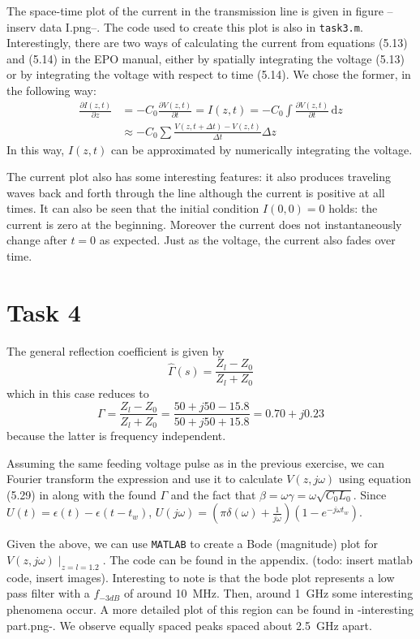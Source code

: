 \documentclass[11pt,titlepage]{report}
\begin{document}
The space-time plot of the current in the transmission line is given in figure --inserv data I.png--. The code used to create this plot is also in \texttt{task3.m}. Interestingly, there are two ways of calculating the current from equations (5.13) and (5.14) in the EPO manual, either by spatially integrating the voltage (5.13) or by integrating the voltage with respect to time (5.14). We chose the former, in the following way:
\begin{align}
\frac{\partial I(z,t)}{\partial z}&=-C_0\frac{\partial V(z,t)}{\partial t} = I(z,t)=-C_0\int \! \frac{\partial V(z,t)}{\partial t}\, \mathrm{d}z \nonumber \\
&\approx -C_0\sum\frac{V(z,t+\Delta t)-V(z,t)}{\Delta t}\Delta z
\end{align}
In this way, $I(z,t)$ can be approximated by numerically integrating the voltage. 

The current plot also has some interesting features: it also produces traveling waves back and forth through the line although the current is positive at all times. It can also be seen that the initial condition $I(0,0)=0$ holds: the current is zero at the beginning. Moreover the current does not instantaneously change after $t=0$ as expected. Just as the voltage, the current also fades over time.

\section{Task 4}
The general reflection coefficient is given by 
\begin{equation}
\hat{\Gamma}(s)=\frac{Z_l-Z_0}{Z_l+Z_0}
\end{equation}
which in this case reduces to
\begin{equation}
\Gamma = \frac{Z_l-Z_0}{Z_l+Z_0}=\frac{50+j50-15.8}{50+j50+15.8}=0.70+j0.23
\end{equation}
because the latter is frequency independent.

Assuming the same feeding voltage pulse as in the previous exercise, we can Fourier transform the expression and use it to calculate $V(z,j\omega)$ using equation (5.29) in \cite[63]{epo4-manual} along with the found $\Gamma$ and the fact that $\beta=\omega\gamma=\omega\sqrt{C_0L_0}$. Since $U(t)=\epsilon(t)-\epsilon(t-t_w)$, $U(j\omega)=(\pi\delta(\omega)+\frac{1}{j\omega})(1-e^{-j\omega t_w})$.

Given the above, we can use \texttt{MATLAB} to create a Bode (magnitude) plot for $V(z,j\omega)\mid_{z=l=1.2}$. The code can be found in the appendix. (todo: insert matlab code, insert images). 
Interesting to note is that the bode plot represents a low pass filter with a $f_{-3dB}$ of around \SI{10}{\mega\hertz}. Then, around \SI{1}{\giga\hertz} some interesting phenomena occur. A more detailed plot of this region can be found in -interesting part.png-. We observe equally spaced peaks spaced about \SI{2.5}{\giga\hertz} apart.
\end{document}
